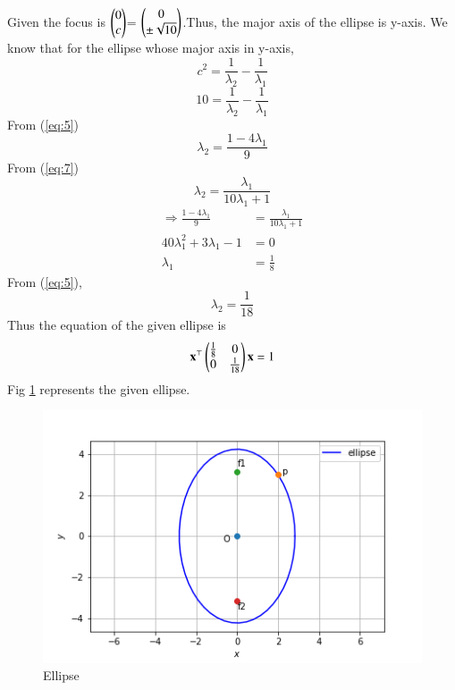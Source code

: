 \documentclass[journal,12pt,twocolumn]{IEEEtran}
\begin{document}
Given the focus is $\begin{pmatrix}0 \\ c\end{pmatrix}$= $\begin{pmatrix}0 \\ \pm \sqrt{10}\end{pmatrix}$.Thus, the major axis of the ellipse is y-axis.
We know that for the ellipse whose major axis in y-axis,
\begin{equation}
    c^2=\frac{1}{\lambda_2}-\frac{1}{\lambda_1}
\end{equation}
\begin{equation}
     10=\frac{1}{\lambda_2}-\frac{1}{\lambda_1} \label{eq:7}
\end{equation}
From (\ref{eq:5})
\begin{equation}
    \lambda_2 = \frac{1-4\lambda_1 }{9}
\end{equation}
From (\ref{eq:7})
\begin{equation}
    \lambda_2 = \frac{\lambda_1 }{10\lambda_1 + 1}
\end{equation}
\begin{align}
  \Longrightarrow  \frac{1-4\lambda_1 }{9}&=\frac{\lambda_1 }{10\lambda_1 + 1}\\
  40\lambda_1^{2}+3\lambda_1-1&=0\\
  \lambda_1&=\frac{1}{8}
\end{align}
From (\ref{eq:5}),
\begin{equation}
    \lambda_2=\frac{1}{18}
\end{equation}
Thus the equation of the given ellipse is
\begin{equation}
    \mathbf{x}^{\top}\begin{pmatrix}\frac{1}{8}&0\\0&\frac{1}{18}\end{pmatrix}\mathbf{x} = 1
\end{equation}
Fig \ref{fig:1} represents the given ellipse.
\begin{figure}[!ht]
\centering
    \includegraphics[width= \columnwidth]{assignment6.png}
    \caption{Ellipse} \label{fig:1}
\end{figure}
\end{document}
